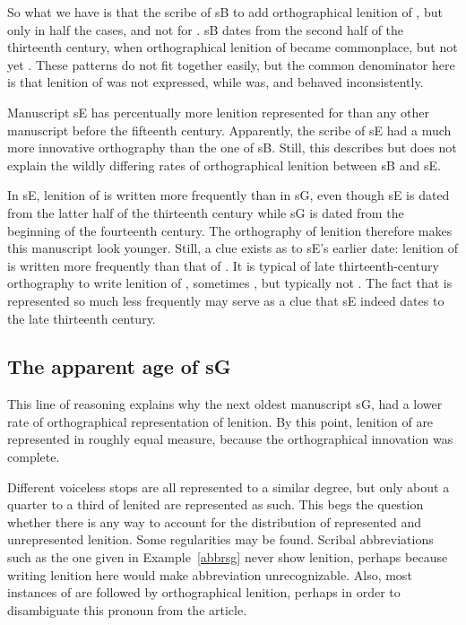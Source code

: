 So what we have is that the scribe of \gls{sB} to add orthographical lenition of , but only in half the cases, and not for . \Gls{sB} dates from the second half of the thirteenth century, when orthographical lenition of  became commonplace, but not yet . These patterns do not fit together easily, but the common denominator here is that lenition of  was not expressed, while  was, and  behaved inconsistently. 

Manuscript \gls{sE} has percentually more lenition represented for  than any other manuscript before the fifteenth century. Apparently, the scribe of \gls{sE} had a much more innovative orthography than the one of \gls{sB}. Still, this describes but does not explain the wildly differing rates of orthographical lenition between \gls{sB} and \gls{sE}.

In \gls{sE}, lenition of  is written more frequently than in \gls{sG}, even though \gls{sE} is dated from the latter half of the thirteenth century while \gls{sG} is dated from the beginning of the fourteenth century. The orthography of lenition therefore makes this manuscript look younger. Still, a clue exists as to \gls{sE}'s earlier date: lenition of  is written  more frequently than that of . It is typical of late thirteenth-century orthography to write lenition of , sometimes , but typically not . The fact that  is represented so much less frequently may serve as a clue that \gls{sE} indeed dates to the late thirteenth century.


\subsection{The apparent age of \gls{sG}}
\label{sec:apparent-age-glssg}

This line of reasoning explains why the next oldest manuscript \gls{sG}, had a lower rate of orthographical representation of lenition. By this point, lenition of  are represented in roughly equal measure, because the orthographical innovation was complete. 

Different voiceless stops are all represented to a similar degree, but only about a quarter to a third of lenited  are represented as such. This begs the question whether there is any way to account for the distribution of represented and unrepresented lenition. Some regularities may be found. Scribal abbreviations such as the one given in Example~\ref{abbrsg} never show lenition, perhaps because writing lenition here would make abbreviation unrecognizable.
Also, most instances of  are followed by orthographical lenition, perhaps in order to disambiguate this pronoun from the article.

